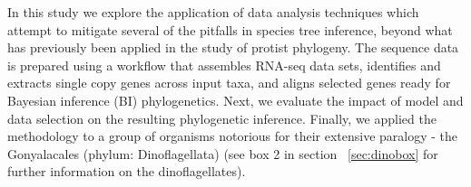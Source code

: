 \documentclass[12pt]{article}
\begin{document}
In this study we explore the application of data analysis techniques which attempt to mitigate several of the pitfalls in species tree inference, beyond what has previously been applied in the study of protist phylogeny.
The sequence data is prepared using a workflow that assembles RNA-seq data sets, identifies and extracts single copy genes across input taxa, and aligns selected genes ready for Bayesian inference (BI) phylogenetics.
Next, we evaluate the impact of model and data selection on the resulting phylogenetic inference. 
Finally, we applied the methodology to a group of organisms notorious for their extensive paralogy - the Gonyalacales (phylum: Dinoflagellata) (see box 2 in section ~\ref{sec:dinobox} for further information on the dinoflagellates).



\end{document}
